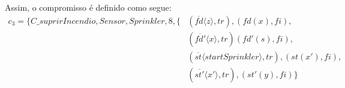 Assim, o compromisso é definido como segue:
\begin{eqnarray}
c_{3} = \{ C\_suprirIncendio, Sensor, Sprinkler, 8, \{& (\overline{fd}\langle z \rangle, tr), (fd(x), fi), & \nonumber \\  &(\overline{fd'}\langle x \rangle, tr) 
(fd'(s), fi), & \nonumber \\ & (\overline{st}\langle startSprinkler \rangle, tr), (st(x'), fi), & \nonumber \\ & (\overline{st'}\langle x' \rangle, tr), (st'(y), fi) \}&
\end{eqnarray}